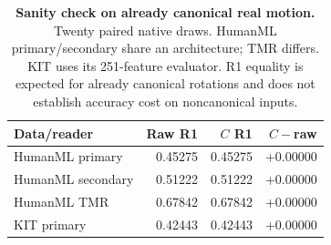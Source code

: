 \begin{table}[t]
\centering\footnotesize
\caption{\textbf{Sanity check on already canonical real motion.} Twenty paired native draws. HumanML primary/secondary share an architecture; TMR differs. KIT uses its 251-feature evaluator. R1 equality is expected for already canonical rotations and does not establish accuracy cost on noncanonical inputs.}\label{tab:defensecost}
\begin{tabular}{@{}lrrr@{}}\toprule
Data/reader&Raw R1&$C$ R1&$C-$raw\\\midrule
HumanML primary&0.45275&0.45275&+0.00000\\
HumanML secondary&0.51222&0.51222&+0.00000\\
HumanML TMR&0.67842&0.67842&+0.00000\\
KIT primary&0.42443&0.42443&+0.00000\\
\bottomrule\end{tabular}\end{table}
